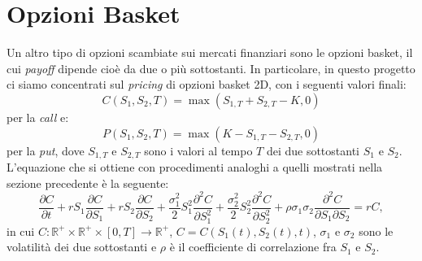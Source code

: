 \documentclass[a4paper,10pt]{report}
\newcommand{\der}[2]{\frac{\partial #1}{\partial #2}}
\newcommand{\dder}[2]{\frac{\partial^2 #1}{\partial #2^2}}
\newcommand{\dmix}[3]{\frac{\partial^2 #1}{\partial #2 \partial #3}}
\theoremstyle{plain}
\theoremstyle{definition}
\theoremstyle{remark}
\begin{document}
\section{Opzioni Basket}
Un altro tipo di opzioni scambiate sui mercati finanziari sono le opzioni basket, il cui \emph{payoff} dipende cio\`e da due o pi\`u sottostanti. In particolare, in questo progetto ci siamo concentrati sul \emph{pricing} di opzioni basket 2D, con i seguenti valori finali: $$C(S_1, S_2, T)=\max(S_{1,T}+S_{2,T}-K,0)$$ per la \emph{call} e: $$P(S_1, S_2, T)=\max(K-S_{1,T}-S_{2,T},0)$$ per la \emph{put}, dove $S_{1,T}$ e $S_{2,T}$ sono i valori al tempo $T$ dei due sottostanti $S_1$ e $S_2$.\\L'equazione che si ottiene con procedimenti analoghi a quelli mostrati nella sezione precedente \`e la seguente:
\begin{equation}
\der{C}{t}+rS_1\der{C}{S_1}+rS_2\der{C}{S_2}+\frac{\sigma^2_1}{2}S_1^2\dder{C}{S_1}+\frac{\sigma^2_2}{2}S_2^2\dder{C}{S_2}+\rho\sigma_1\sigma_2\dmix{C}{S_1}{S_2}=rC,
\label{pde2d}
\end{equation}
in cui $C:\mathbb{R}^+\times\mathbb{R}^+\times[0,T]\rightarrow\mathbb{R}^+$, $C=C(S_1(t), S_2(t),t)$, $\sigma_1$ e $\sigma_2$ sono le volatilit\`a dei due sottostanti e $\rho$ \`e il coefficiente di correlazione fra $S_1$ e $S_2$.
\end{document}
